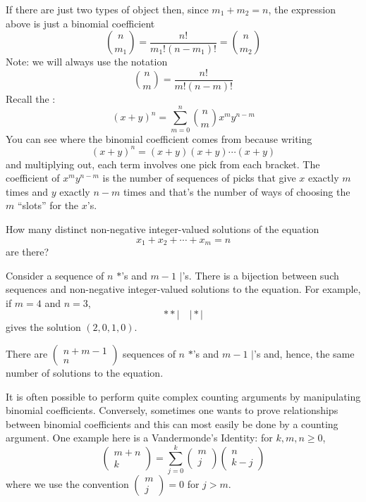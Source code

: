 If there are just two types of object then, since $m_1 + m_2 = n$, the expression above is just a binomial coefficient
\[ \binom{n}{m_1} = \frac{n!}{m_1!(n-m_1)!} = \binom{n}{m_2} \]
Note: we will always use the notation
\[ \binom{n}{m} = \frac{n!}{m!(n-m)!} \]
Recall the :
\begin{equation}
(x+y)^n = \sum_{m=0}^n \binom{n}{m} x^m y^{n-m}
\end{equation}
You can see where the binomial coefficient comes from because writing
\[ (x+y)^n = (x+y)(x+y)\cdots(x+y) \]
and multiplying out, each term involves one pick from each bracket. The coefficient of $x^my^{n-m}$ is the number of sequences of picks that give $x$ exactly $m$ times and $y$ exactly $n-m$ times and that's the number of ways of choosing the $m$ ``slots'' for the $x$'s.

\begin{exercise}{}{}
How many distinct non-negative integer-valued solutions of the equation
\[ x_1+x_2+\cdots+x_m=n \]
are there?
\end{exercise}
\begin{solution}
Consider a sequence of $n$ $\ast$'s and $m-1$ $|$'s. There is a bijection between such sequences and non-negative integer-valued solutions to the equation. For example, if $m=4$ and $n=3$,
\[ \ast\ast|\quad|\ast| \]
gives the solution $(2,0,1,0)$.

There are $\begin{pmatrix}n+m-1\\n\end{pmatrix}$ sequences of $n$ $\ast$'s and $m-1$ $|$'s and, hence, the same number of solutions to the equation.
\end{solution}

It is often possible to perform quite complex counting arguments by manipulating binomial coefficients. Conversely, sometimes one wants to prove relationships between binomial coefficients and this can most easily be done by a counting argument. One example here is a Vandermonde's Identity: for $k,m,n\ge0$,
\[ \begin{pmatrix}m+n\\k\end{pmatrix}=\sum_{j=0}^k\begin{pmatrix}m\\j\end{pmatrix}\begin{pmatrix}n\\k-j\end{pmatrix} \]
where we use the convention $\begin{pmatrix}m\\j\end{pmatrix}=0$ for $j>m$.

